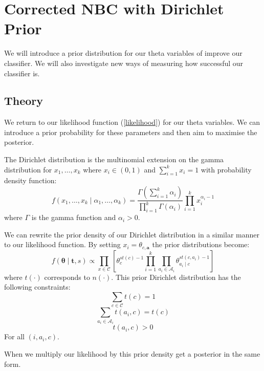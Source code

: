 \chapter{Corrected NBC with Dirichlet Prior}

We will introduce a prior distribution for our theta variables of improve our classifier. We will also investigate new ways of measuring how successful our classifier is.

\section{Theory}

We return to our likelihood function (\ref{likelihood}) for our theta variables. We can introduce a prior probability for these parameters and then aim to maximise the posterior.

The Dirichlet distribution is the multinomial extension on the gamma distribution for $x_1,\dots,x_k$ where $x_i \in (0,1)$ and $\sum_{i=1}^k x_i = 1$ with probability density function:
\begin{equation} \label{dirichlet_pdf}
	f(x_1,\dots,x_k \mid \alpha_1,\dots,\alpha_k) = \frac{\Gamma(\sum_{i=1}^k\alpha_i)}{\prod_{i=1}^k\Gamma(\alpha_i)} \prod_{i=1}^k x_i^{\alpha_i - 1}
\end{equation}
where $\Gamma$ is the gamma function and $\alpha_i > 0$.

We can rewrite the prior density of our Dirichlet distribution in a similar manner to our likelihood function. By setting $x_i = \theta_{c,\mathbf{a}}$ the prior distributions become:
\begin{equation} \label{prior}
	f(\mathbf{\theta} \mid \mathbf{t}, s) \propto \prod_{x \in \mathcal{C}} \left[ \theta_c^{st(c) - 1} \prod_{i=1}^k \prod_{a_i \in \mathcal{A}_i} \theta_{a_i \mid c}^{st(c, a_i) - 1} \right]
\end{equation}
where $t(\cdot)$ corresponds to $n(\cdot)$. This prior Dirichlet distribution \cite{Zaffalon01} has the following constraints:
\begin{equation}
	\sum_{c \in \mathcal{C}} t(c) = 1
\end{equation}
\begin{equation}
	\sum_{a_i \in \mathcal{A}_i} t(a_i, c) = t(c)
\end{equation}
\begin{equation}
	t(a_i, c) > 0
\end{equation}
For all $(i, a_i, c)$.

When we multiply our likelihood by this prior density get a posterior in the same form.